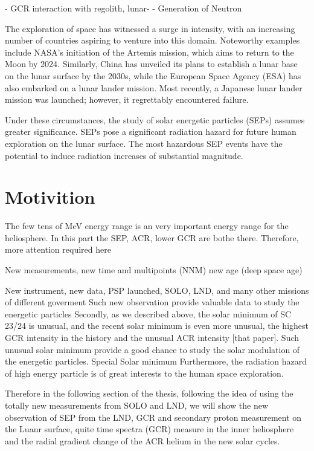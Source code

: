 - GCR interaction with regolith, lunar-
	- Generation of Neutron

The exploration of space has witnessed a surge in intensity, with an increasing number of countries aspiring to venture into this domain. Noteworthy examples include NASA's initiation of the Artemis mission, which aims to return to the Moon by 2024. Similarly, China has unveiled its plans to establish a lunar base on the lunar surface by the 2030s, while the European Space Agency (ESA) has also embarked on a lunar lander mission. Most recently, a Japanese lunar lander mission was launched; however, it regrettably encountered failure.

Under these circumstances, the study of solar energetic particles (SEPs) assumes greater significance. SEPs pose a significant radiation hazard for future human exploration on the lunar surface. The most hazardous SEP events have the potential to induce radiation increases of substantial magnitude.

\section{Motivition}

The few tens of MeV energy range is an very important energy range for the heliosphere. In this part the SEP, ACR, lower GCR are bothe there. Therefore, more attention required here

New measurements, new time and multipoints (NNM)
new age (deep space age)

New instrument, new data, PSP launched, SOLO, LND, and many other missions of different goverment
Such new observation provide valuable data to study the energetic particles
Secondly, as we described above, the solar minimum of SC 23/24 is unusual, and the recent solar minimum is even more unusual, the highest GCR intensity in the history and the unusual ACR intensity [that paper]. Such unusual solar minimum provide a good chance to study the solar modulation of the energetic particles. Special Solar minimum
Furthermore, the radiation hazard of high energy particle is of great interests to the human space exploration. 


Therefore in the following section of the thesis, following the idea of using the totally new measurements from SOLO and LND, we will show the new observation of SEP from the LND, GCR and secondary proton measurement on the Luanr surface, quite time spectra (GCR) measure in the inner heliosphere and the radial gradient change of the ACR helium in the new solar cycles.